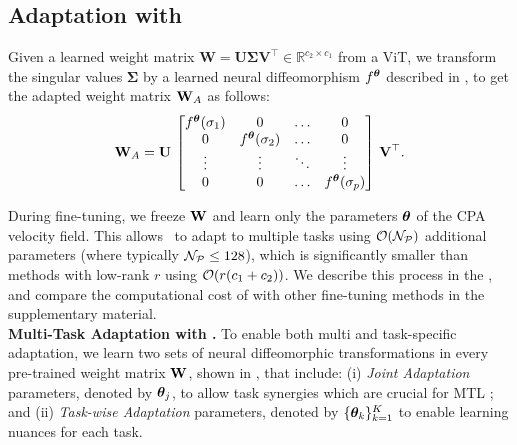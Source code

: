 \subsection{Adaptation with \ourmethod}
\label{subsec:ditask}
Given a learned weight matrix $\mathbf W = \mathbf{U} \mathbf{\Sigma} \mathbf{V}^\top \in \mathbb{R}^{c_2 \times c_1}$ from a ViT, we transform the singular values $\mathbf{\Sigma}$ by a learned neural diffeomorphism $f^{{\bm{\theta}}}$ described in , to get the adapted weight matrix ${\mathbf{W}}_A$ as follows:
\small
\begin{equation}
\label{eq:cpab_ditask}
     {\mathbf{W}}_A = {\mathbf{U}} \, \begin{bmatrix}
        f^{{\bm{\theta}}}(\sigma_1) & 0 & \ldots & 0 \\
    0 & f^{{\bm{\theta}}}(\sigma_2) & \ldots & 0 \\
     \vdots & \vdots & \ddots & \vdots \\
     0 & 0 & \ldots & f^{{\bm{\theta}}}(\sigma_p)
    \end{bmatrix} \, {\mathbf{V}}^\top.
\end{equation}


\noindent During fine-tuning, we freeze ${\mathbf{W}}$ and learn only the parameters ${\bm{\theta}}$ of the CPA velocity field. This allows \ourmethod\ to adapt to multiple tasks using ${\mathcal{O}}({\mathcal{N}}_{\mathcal{P}})$ additional parameters (where typically  ${\mathcal{N}}_{\mathcal{P}} \leq 128$), which is significantly smaller than  methods with low-rank $r$ using ${\mathcal{O}}(r(c_1 + c_2))$. We describe this process in the , and compare the computational cost of \ourmethod{} with other fine-tuning methods in the supplementary material.
\\
\noindent\textbf{Multi-Task Adaptation with \ourmethod.}  
To enable both multi and task-specific adaptation, we learn two sets of neural diffeomorphic transformations in every pre-trained weight matrix ${\mathbf{W}}$, shown in   , that include: (i) \textit{Joint Adaptation} parameters, denoted by ${\bm{\theta}}_j$, to allow task synergies which are crucial for MTL \citep{Huang_2024_CVPR,mtl_survey}; and (ii) \textit{Task-wise Adaptation} parameters, denoted by $\{{\bm{\theta}}_k\}_{k=1}^K$ to enable learning nuances for each task.



